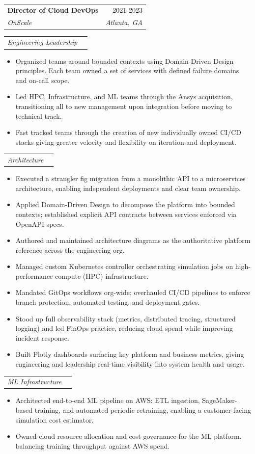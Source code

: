 \documentclass[letterpaper,11pt]{article}
\makeatletter
\newcommand{\resumeItem}[1]{
  \item\small{
    {#1 \vspace{-2pt}}
  }
}
\newcommand{\resumeSubheading}[4]{
  \vspace{-2pt}\item
    \begin{tabular*}{0.97\textwidth}[t]{l@{\extracolsep{\fill}}r}
      \textbf{#1} & #2 \\
      \textit{\small#3} & \textit{\small #4} \\
    \end{tabular*}\vspace{-7pt}
}
\newcommand{\resumeSubSubheading}[2]{
    \item
    \begin{tabular*}{0.97\textwidth}{l@{\extracolsep{\fill}}r}
      \textit{\small#1} & \textit{\small #2} \\
    \end{tabular*}\vspace{-7pt}
}
\newcommand{\resumeItemListStart}{\begin{itemize}}
\newcommand{\resumeItemListEnd}{\end{itemize}\vspace{-5pt}}
\makeatother
\begin{document}
    \resumeSubheading
      {Director of Cloud DevOps}{2021-2023}
      {OnScale}{Atlanta, GA}
      \resumeSubSubheading
      {Engineering Leadership}{}
      \resumeItemListStart
        \resumeItem{Organized teams around bounded contexts using Domain-Driven Design principles. Each team owned a set of services with defined failure domains and on-call scope.}
        \resumeItem{Led HPC, Infrastructure, and ML teams through the Ansys acquisition, transitioning all to new management upon integration before moving to technical track.}
        \resumeItem{Fast tracked teams through the creation of new individually owned CI/CD stacks giving greater velocity and flexibility on iteration and deployment.}
      \resumeItemListEnd
      \resumeSubSubheading
      {Architecture}{}
      \resumeItemListStart
        \resumeItem{Executed a strangler fig migration from a monolithic API to a microservices architecture, enabling independent deployments and clear team ownership.}
        \resumeItem{Applied Domain-Driven Design to decompose the platform into bounded contexts; established explicit API contracts between services enforced via OpenAPI specs.}
        \resumeItem{Authored and maintained architecture diagrams as the authoritative platform reference across the engineering org.}
        \resumeItem{Managed custom Kubernetes controller orchestrating simulation jobs on high-performance compute (HPC) infrastructure.}
        \resumeItem{Mandated GitOps workflows org-wide; overhauled CI/CD pipelines to enforce branch protection, automated testing, and deployment gates.}
        \resumeItem{Stood up full observability stack (metrics, distributed tracing, structured logging) and led FinOps practice, reducing cloud spend while improving incident response.}
        \resumeItem{Built Plotly dashboards surfacing key platform and business metrics, giving engineering and leadership real-time visibility into system health and usage.}
      \resumeItemListEnd
      \resumeSubSubheading
      {ML Infrastructure}{}
      \resumeItemListStart
        \resumeItem{Architected end-to-end ML pipeline on AWS: ETL ingestion, SageMaker-based training, and automated periodic retraining, enabling a customer-facing simulation cost estimator.}
        \resumeItem{Owned cloud resource allocation and cost governance for the ML platform, balancing training throughput against AWS spend.}
      \resumeItemListEnd
\end{document}
